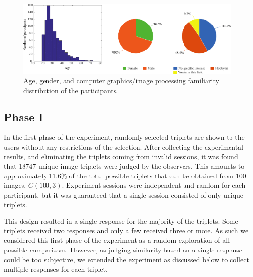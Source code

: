 \begin{figure}
\begin{center}
\includegraphics[width=\textwidth]{figures/chapter3/age_gender_cgi.pdf}
\caption{Age, gender, and computer graphics/image processing familiarity distribution of the participants.
}
\label{fig:age_gender_cgi}
\end{center}
\end{figure}

\subsection{Phase I}
\label{sec:exp_phase_I}
In the first phase of the experiment, randomly selected triplets are shown to the users without any restrictions of the selection. After collecting the experimental results, and eliminating the triplets coming from invalid sessions, it was found that 18747 unique image triplets were judged by the observers. This amounts to approximately 11.6\% of the total possible triplets that can be obtained from 100 images, $C(100, 3)$. Experiment sessions were independent and random for each participant, but it was guaranteed that a single session consisted of only unique triplets. 

This design resulted in a single response for the majority of the triplets. Some triplets received two responses and only a few received three or more. As such we considered this first phase of the experiment as a random exploration of all possible comparisons. However, as judging similarity based on a single response could be too subjective, we extended the experiment as discussed below to collect multiple responses for each triplet.

